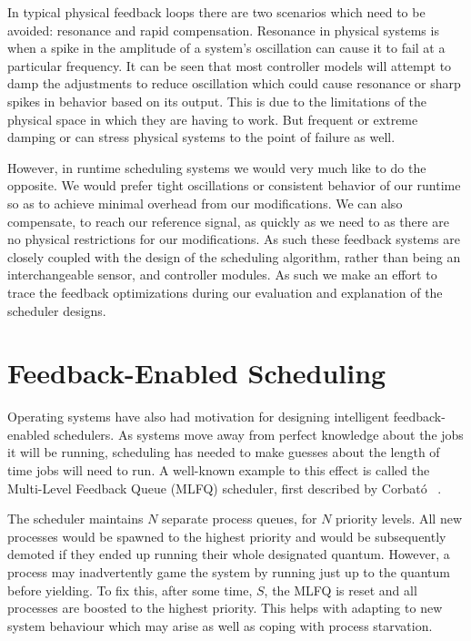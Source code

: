 In typical physical feedback loops there are two scenarios which need to be 
avoided: resonance and rapid compensation. Resonance in physical systems is 
when a spike in the amplitude of a system's oscillation can cause it to fail at 
a particular frequency. It can be seen that most controller 
models will attempt to damp the adjustments to reduce oscillation which could 
cause resonance or sharp spikes in behavior based on its output. This is due to 
the limitations of the physical space in which they are having to work. But 
frequent or extreme damping or can stress physical systems to the point of
failure as well.

However, in runtime scheduling systems we would very much like to do the 
opposite. We would prefer tight oscillations or consistent behavior of our 
runtime so as to achieve minimal overhead from our modifications. We can also 
compensate, to reach our reference signal, as quickly as we need to as there 
are no physical restrictions for our modifications.
As such these feedback systems are closely coupled with the design of the 
scheduling algorithm, rather than being an interchangeable sensor, and controller
modules. As such we make an effort to trace the feedback optimizations during
our evaluation and explanation of the scheduler designs.


\section{Feedback-Enabled Scheduling}

Operating systems have also had motivation for designing intelligent 
feedback-enabled schedulers. As systems move away from perfect knowledge about 
the jobs it will be running, scheduling has needed to make guesses about the 
length of time jobs will need to run. A well-known example to this effect is
called the Multi-Level Feedback Queue (MLFQ) scheduler, first described by 
Corbat{\'o} \etal~\cite{corbato1962experimental,ArpaciDusseau14Book}.

The scheduler maintains $N$ separate process queues, for $N$ priority levels. 
All new processes would be spawned to the highest priority and would be 
subsequently demoted if they ended up running their whole designated quantum. 
However, a process may inadvertently game the system by running just up to the
quantum before yielding. To fix this, after some time, $S$, the MLFQ is reset 
and all processes are boosted to the highest priority. This helps with adapting 
to new system behaviour which may arise as well as coping with process 
starvation.

